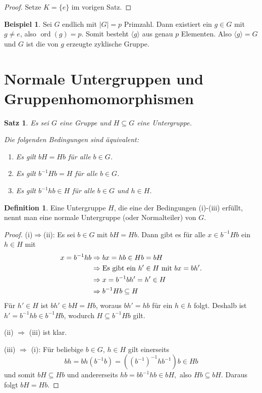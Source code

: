 \documentclass[12pt]{scrartcl} %
\DeclareMathOperator{\ord}{ord}
\newtheorem{thm}{Satz}
\theoremstyle{definition}
\newtheorem*{defn}{Definition}
\newtheorem{ex}{Beispiel}
\theoremstyle{remark}
\begin{document}
\begin{proof}
	Setze $K = \{e\}$ im vorigen Satz.
\end{proof}

\begin{ex}
	Sei $G$ endlich mit $\vert G\vert=p$ Primzahl.
	Dann existiert ein $g \in G$ mit $g \neq e$, also $\ord(g)=p$.
	Somit besteht $\langle g\rangle$ aus genau $p$ Elementen.
	Also $\langle g\rangle=G$ und $G$ ist die von $g$ erzeugte zyklische Gruppe.
\end{ex}

\section{Normale Untergruppen und Gruppenhomomorphismen}

\begin{thm}
	Es sei $G$ eine Gruppe und $H\subseteq G$ eine Untergruppe.

	Die folgenden Bedingungen sind äquivalent:
	\begin{enumerate}[label=(\roman*)]
	\item Es gilt $bH=Hb$ für alle $b\in G$.
	\item Es gilt $b^{-1}Hb=H$ für alle $b\in G$.
	\item Es gilt $b^{-1}hb \in H$ für alle $b\in G$ und $h\in H$.
	\end{enumerate}
\end{thm}

\begin{defn}
	Eine Untergruppe $H$, die eine der Bedingungen (i)-(iii) erfüllt, nennt man eine normale Untergruppe (oder Normalteiler) von $G$.
\end{defn}

\begin{proof}
	(i)$\Rightarrow$(ii):
	Es sei $b \in G$ mit $bH=Hb$.
	Dann gibt es für alle $x \in b^{-1}Hb$ ein \(h \in H\) mit
	\begin{align*}
		x=b^{-1}hb &\Rightarrow bx=hb \in Hb=bH\\
		&\Rightarrow \text{Es gibt ein \(h' \in H$ mit $bx=bh'\).}\\
		&\Rightarrow x=b^{-1}bh'=h'\in H\\
		&\Rightarrow b^{-1}Hb \subseteq H
	\end{align*}
	Für $h' \in H$ ist $bh' \in bH = Hb$, woraus $bh'=hb$ für ein $h \in h$ folgt.
	Deshalb ist $h'=b^{-1}hb \in b^{-1}Hb$, wodurch $H \subseteq b^{-1}Hb$ gilt.

	(ii) $\Rightarrow$ (iii) ist klar.

	(iii) $\Rightarrow$ (i):
	Für beliebige $b \in G$, $h\in H$ gilt einerseits
	\[bh=bh(b^{-1}b)=((b^{-1})^{-1}hb^{-1})b \in Hb\]
	und somit \(bH \subseteq Hb\) und andererseits \(hb=bb^{-1}hb \in bH,\) also \(Hb \subseteq bH\).
	Daraus folgt $bH=Hb$.
\end{proof}
\end{document}
